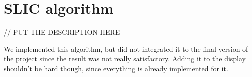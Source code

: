 \section{ SLIC algorithm}
// PUT THE DESCRIPTION HERE

We implemented this algorithm, but did not integrated it to the final version of the project since the result was not really satisfactory. Adding it to the display shouldn't be hard though, since everything is already implemented for it. 